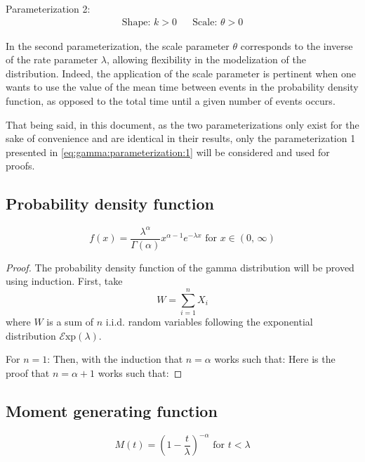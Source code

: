 \documentclass[12pt]{article}
\newcommand{\E}{\mathcal{E}}
\begin{document}
\noindent Parameterization 2:
\vspace*{-24pt}
\begin{align}\label{eq:gamma:parameterization:2}
	\text{Shape: } k>0			&&	\text{Scale: }\theta>0
\end{align}

In the second parameterization, the scale parameter $\theta$ corresponds to the inverse of the rate parameter $\lambda$,
allowing flexibility in the modelization of the distribution. Indeed, the application of the scale parameter is
pertinent when one wants to use the value of the mean time between events in the probability density function, as
opposed to the total time until a given number of events occurs.

That being said, in this document, as the two parameterizations only exist for the sake of convenience and are identical
in their results, only the parameterization 1 presented in \autoref{eq:gamma:parameterization:1} will be considered and
used for proofs.

\subsection{Probability density function }\label{subsec:gamma:pdf}
\begin{equation}\label{eq:gamma:pdf:2}
	f(x) = \frac{\lambda^\alpha}{\Gamma(\alpha)}x^{\alpha-1}e^{-\lambda x}\text{ for }x\in (0,\,\infty)
\end{equation}
\begin{proof}
	The probability density function of the gamma distribution will be proved using induction. First, take
	\begin{equation}
		W=\sum^n_{i=1}X_i
	\end{equation}
	where $W$ is a sum of $n$ i.i.d. random variables following the exponential distribution $\E\text{xp}(\lambda)$.

	\noindent For $n=1$:
	Then, with the induction that $n=\alpha$ works such that:
	Here is the proof that $n=\alpha+1$ works such that:
\end{proof}

\subsection{Moment generating function}
\begin{equation}\label{eq:gamma-mgf-2}
	M(t) = \left(1-\frac{t}{\lambda}\right)^{-\alpha}\text{ for }t < \lambda
\end{equation}
\end{document}
